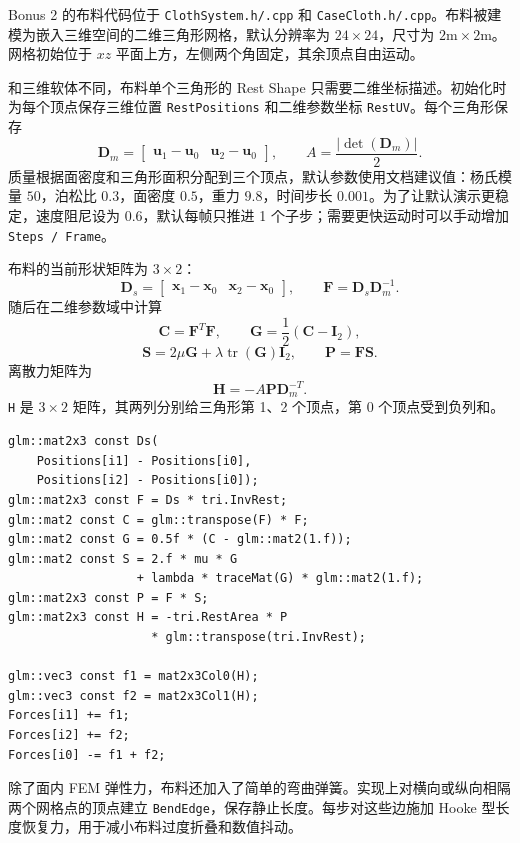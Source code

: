 \documentclass[UTF8,a4paper,11pt,fontset=fandol]{ctexart}
\begin{document}
Bonus 2 的布料代码位于 \texttt{ClothSystem.h/.cpp} 和 \texttt{CaseCloth.h/.cpp}。布料被建模为嵌入三维空间的二维三角形网格，默认分辨率为 $24\times24$，尺寸为 $2\mathrm{m}\times2\mathrm{m}$。网格初始位于 $xz$ 平面上方，左侧两个角固定，其余顶点自由运动。

和三维软体不同，布料单个三角形的 Rest Shape 只需要二维坐标描述。初始化时为每个顶点保存三维位置 \texttt{RestPositions} 和二维参数坐标 \texttt{RestUV}。每个三角形保存
\[
\mathbf{D}_m =
\begin{bmatrix}
\mathbf{u}_1-\mathbf{u}_0 &
\mathbf{u}_2-\mathbf{u}_0
\end{bmatrix},
\qquad
A=\frac{|\det(\mathbf{D}_m)|}{2}.
\]
质量根据面密度和三角形面积分配到三个顶点，默认参数使用文档建议值：杨氏模量 $50$，泊松比 $0.3$，面密度 $0.5$，重力 $9.8$，时间步长 $0.001$。为了让默认演示更稳定，速度阻尼设为 $0.6$，默认每帧只推进 1 个子步；需要更快运动时可以手动增加 \texttt{Steps / Frame}。

布料的当前形状矩阵为 $3\times2$：
\[
\mathbf{D}_s =
\begin{bmatrix}
\mathbf{x}_1-\mathbf{x}_0 &
\mathbf{x}_2-\mathbf{x}_0
\end{bmatrix},
\qquad
\mathbf{F}=\mathbf{D}_s\mathbf{D}_m^{-1}.
\]
随后在二维参数域中计算
\[
\mathbf{C}=\mathbf{F}^{T}\mathbf{F},\qquad
\mathbf{G}=\frac{1}{2}(\mathbf{C}-\mathbf{I}_2),
\]
\[
\mathbf{S}=2\mu\mathbf{G}+\lambda\operatorname{tr}(\mathbf{G})\mathbf{I}_2,
\qquad
\mathbf{P}=\mathbf{F}\mathbf{S}.
\]
离散力矩阵为
\[
\mathbf{H}=-A\mathbf{P}\mathbf{D}_m^{-T}.
\]
\texttt{H} 是 $3\times2$ 矩阵，其两列分别给三角形第 1、2 个顶点，第 0 个顶点受到负列和。

\begin{lstlisting}[style=cppstyle,caption={布料三角形的 3x2 FEM 内力}]
glm::mat2x3 const Ds(
    Positions[i1] - Positions[i0],
    Positions[i2] - Positions[i0]);
glm::mat2x3 const F = Ds * tri.InvRest;
glm::mat2 const C = glm::transpose(F) * F;
glm::mat2 const G = 0.5f * (C - glm::mat2(1.f));
glm::mat2 const S = 2.f * mu * G
                  + lambda * traceMat(G) * glm::mat2(1.f);
glm::mat2x3 const P = F * S;
glm::mat2x3 const H = -tri.RestArea * P
                    * glm::transpose(tri.InvRest);

glm::vec3 const f1 = mat2x3Col0(H);
glm::vec3 const f2 = mat2x3Col1(H);
Forces[i1] += f1;
Forces[i2] += f2;
Forces[i0] -= f1 + f2;
\end{lstlisting}

除了面内 FEM 弹性力，布料还加入了简单的弯曲弹簧。实现上对横向或纵向相隔两个网格点的顶点建立 \texttt{BendEdge}，保存静止长度。每步对这些边施加 Hooke 型长度恢复力，用于减小布料过度折叠和数值抖动。
\end{document}
